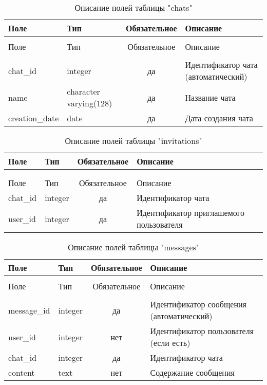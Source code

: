 \begin{xltabular}{\textwidth}{|l|l|c|X|}
	\caption{Описание полей таблицы "chats"\label{chats:table}} \hline
	Поле & Тип & Обязательное & Описание \\ \hline
	 &  &  & \\ \hline
	\endfirsthead
	 \hline
	Поле & Тип & Обязательное & Описание \\ \hline
	 &  &  & \\ \hline
	\endhead
	chat\_id & integer & да & Идентификатор чата (автоматический) \\ \hline
	name & character varying(128) & да & Название чата \\ \hline
	creation\_date & date & да & Дата создания чата \\ \hline
\end{xltabular}

\begin{xltabular}{\textwidth}{|l|l|c|X|}
	\caption{Описание полей таблицы "invitations"\label{invitations:table}} \hline
	Поле & Тип & Обязательное & Описание \\ \hline
	 &  &  & \\ \hline
	\endfirsthead
	  &  &  & \\ \hline
	\endhead
	Поле & Тип & Обязательное & Описание \\ \hline
	\endhead
	chat\_id & integer & да & Идентификатор чата \\ \hline
	user\_id & integer & да & Идентификатор приглашемого пользователя \\ \hline
\end{xltabular}

\begin{xltabular}{\textwidth}{|l|l|c|X|}
	\caption{Описание полей таблицы "messages"\label{messages:table}} \hline
	Поле & Тип & Обязательное & Описание \\ \hline
	 &  &  & \\ \hline
	\endfirsthead
	 \hline
	Поле & Тип & Обязательное & Описание \\ \hline
	 &  &  & \\ \hline
	\endhead
	message\_id & integer & да & Идентификатор сообщения (автоматический) \\ \hline
	user\_id & integer & нет & Идентификатор пользователя (если есть) \\ \hline
	chat\_id & integer & да & Идентификатор чата \\ \hline
	content & text & нет & Содержание сообщения \\ \hline
\end{xltabular}

